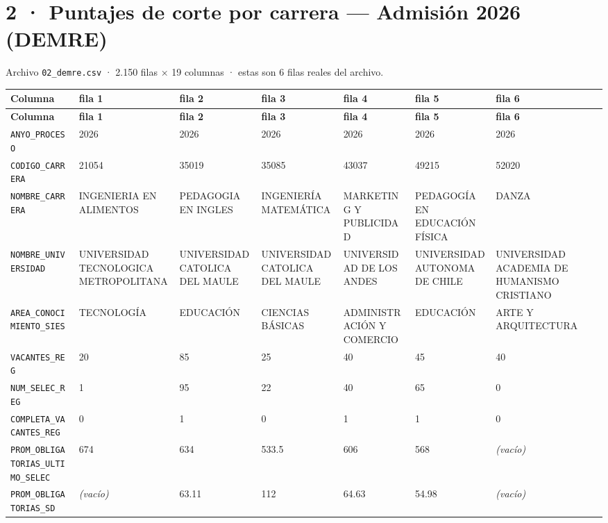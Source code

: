 \documentclass[10pt]{article}
\newcommand{\hdr}[1]{\textbf{\color{white}#1}}
\begin{document}
\section{2 · Puntajes de corte por carrera — Admisión 2026 (DEMRE)}
\small Archivo \texttt{02\_demre.csv} · 2.150 filas × 19 columnas · estas son 6 filas reales del archivo.\normalsize

\footnotesize
\begin{xltabular}{\linewidth}{@{}p{4.3cm} Y Y Y Y Y Y @{}}
\hdr{Columna} & \hdr{fila 1} & \hdr{fila 2} & \hdr{fila 3} & \hdr{fila 4} & \hdr{fila 5} & \hdr{fila 6} \\
\endfirsthead
{}\hdr{Columna} & \hdr{fila 1} & \hdr{fila 2} & \hdr{fila 3} & \hdr{fila 4} & \hdr{fila 5} & \hdr{fila 6} \\
\endhead
{}\texttt{ANYO\_\allowbreak{}PROCESO} & 2026 & 2026 & 2026 & 2026 & 2026 & 2026 \\
\texttt{CODIGO\_\allowbreak{}CARRERA} & 21054 & 35019 & 35085 & 43037 & 49215 & 52020 \\
\texttt{NOMBRE\_\allowbreak{}CARRERA} & INGENIERIA EN ALIMENTOS & PEDAGOGIA EN INGLES & INGENIERÍA MATEMÁTICA & MARKETING Y PUBLICIDAD & PEDAGOGÍA EN EDUCACIÓN FÍSICA & DANZA \\
\texttt{NOMBRE\_\allowbreak{}UNIVERSIDAD} & UNIVERSIDAD TECNOLOGICA METROPOLITANA & UNIVERSIDAD CATOLICA DEL MAULE & UNIVERSIDAD CATOLICA DEL MAULE & UNIVERSIDAD DE LOS ANDES & UNIVERSIDAD AUTONOMA DE CHILE & UNIVERSIDAD ACADEMIA DE HUMANISMO CRISTIANO \\
\texttt{AREA\_\allowbreak{}CONOCIMIENTO\_\allowbreak{}SIES} & TECNOLOGÍA & EDUCACIÓN & CIENCIAS BÁSICAS & ADMINISTRACIÓN Y COMERCIO & EDUCACIÓN & ARTE Y ARQUITECTURA \\
\texttt{VACANTES\_\allowbreak{}REG} & 20 & 85 & 25 & 40 & 45 & 40 \\
\texttt{NUM\_\allowbreak{}SELEC\_\allowbreak{}REG} & 1 & 95 & 22 & 40 & 65 & 0 \\
\texttt{COMPLETA\_\allowbreak{}VACANTES\_\allowbreak{}REG} & 0 & 1 & 0 & 1 & 1 & 0 \\
\texttt{PROM\_\allowbreak{}OBLIGATORIAS\_\allowbreak{}ULTIMO\_\allowbreak{}SELEC} & 674 & 634 & 533.5 & 606 & 568 & \textit{\color{gris}(vacío)} \\
\texttt{PROM\_\allowbreak{}OBLIGATORIAS\_\allowbreak{}SD} & \textit{\color{gris}(vacío)} & 63.11 & 112 & 64.63 & 54.98 & \textit{\color{gris}(vacío)} \\

\end{xltabular}
\end{document}
